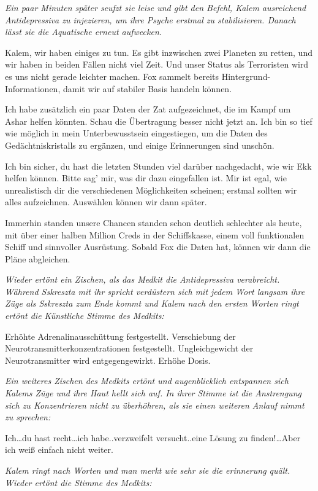 \documentclass[11pt]{scrartcl}
\begin{document}
\emph{Ein paar Minuten später seufzt sie leise und gibt den Befehl,
Kalem ausreichend Antidepressiva zu injezieren, um ihre Psyche erstmal
zu stabilisieren. Danach lässt sie die Aquatische erneut aufwecken.}

Kalem, wir haben einiges zu tun. Es gibt inzwischen zwei Planeten zu
retten, und wir haben in beiden Fällen nicht viel Zeit. Und unser Status
als Terroristen wird es uns nicht gerade leichter machen. Fox sammelt
bereits Hintergrund-Informationen, damit wir auf stabiler Basis handeln
können.

Ich habe zusätzlich ein paar Daten der Zat aufgezeichnet, die im Kampf
um Ashar helfen könnten. Schau die Übertragung besser nicht jetzt an.
Ich bin so tief wie möglich in mein Unterbewusstsein eingestiegen, um
die Daten des Gedächtniskristalls zu ergänzen, und einige Erinnerungen
sind unschön.

Ich bin sicher, du hast die letzten Stunden viel darüber nachgedacht,
wie wir Ekk helfen können. Bitte sag' mir, was dir dazu eingefallen ist.
Mir ist egal, wie unrealistisch dir die verschiedenen Möglichkeiten
scheinen; erstmal sollten wir alles aufzeichnen. Auswählen können wir
dann später.

Immerhin standen unsere Chancen standen schon deutlich schlechter als
heute, mit über einer halben Million Creds in der Schiffskasse, einem
voll funktionalen Schiff und sinnvoller Ausrüstung. Sobald Fox die Daten
hat, können wir dann die Pläne abgleichen.

\emph{Wieder ertönt ein Zischen, als das Medkit die Antidepressiva
verabreicht. Während Sskreszta mit ihr spricht verdüstern sich mit jedem
Wort langsam ihre Züge als Sskreszta zum Ende kommt und Kalem nach den
ersten Worten ringt ertönt die Künstliche Stimme des Medkits:}

Erhöhte Adrenalinausschüttung festgestellt. Verschiebung der
Neurotransmitterkonzentrationen festgestellt. Ungleichgewicht der
Neurotransmitter wird entgegengewirkt. Erhöhe Dosis.

\emph{Ein weiteres Zischen des Medkits ertönt und augenblicklich
entspannen sich Kalems Züge und ihre Haut hellt sich auf. In ihrer
Stimme ist die Anstrengung sich zu Konzentrieren nicht zu überhöhren,
als sie einen weiteren Anlauf nimmt zu sprechen:}

Ich\ldots{}du hast recht\ldots{}ich habe..verzweifelt versucht..eine
Lösung zu finden!\ldots{}Aber ich weiß einfach nicht weiter.

\emph{Kalem ringt nach Worten und man merkt wie sehr sie die erinnerung
quält. Wieder ertönt die Stimme des Medkits:}
\end{document}
